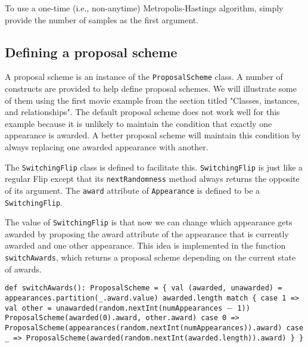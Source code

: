 To use a one-time (i.e., non-anytime) Metropolis-Hastings algorithm, simply provide the number of samples as the first argument.

\subsection{Defining a proposal scheme}

A proposal scheme is an instance of the \texttt{ProposalScheme} class. A number of constructs are provided to help define proposal schemes. We will illustrate some of them using the first movie example from the section titled "Classes, instances, and relationships". The default proposal scheme does not work well for this example because it is unlikely to maintain the condition that exactly one appearance is awarded. A better proposal scheme will maintain this condition by always replacing one awarded appearance with another.

The \texttt{SwitchingFlip} class is defined to facilitate this. \texttt{SwitchingFlip} is just like a regular Flip except that its \texttt{nextRandomness} method always returns the opposite of its argument. The \texttt{award} attribute of \texttt{Appearance} is defined to be a \texttt{SwitchingFlip}. 

The value of \texttt{SwitchingFlip} is that now we can change which appearance gets awarded by proposing the award attribute of the appearance that is currently awarded and one other appearance. This idea is implemented in the function \texttt{switchAwards}, which returns a proposal scheme depending on the current state of awards.

\begin{flushleft}
\texttt{def switchAwards(): ProposalScheme = \{
\newline \tab val (awarded, unawarded) = 
\newline \tab appearances.partition(\_.award.value)
\newline \tab awarded.length match \{
\newline \tab case 1 =>
\newline \tab val other = unawarded(random.nextInt(numAppearances $-$ 1)) 
\newline \tab ProposalScheme(awarded(0).award, other.award)
\newline \tab case 0 => 
\newline \tab ProposalScheme(appearances(random.nextInt(numAppearances)).award)
\newline \tab case \_ => 
\newline \tab ProposalScheme(awarded(random.nextInt(awarded.length)).award)
\newline \}
\newline \}
}
\end{flushleft}

